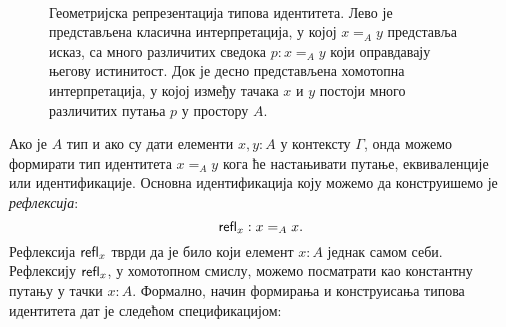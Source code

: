 \documentclass[12pt,oneside]{memoir}
\begin{document}
\begin{figure}[!ht]
    \centering\
    \label{fig:id_type}
    \caption{Геометријска репрезентација типова идентитета. Лево је представљена класична интерпретација, у којој $x =_A y$ представља исказ, са много различитих сведока $p : x =_A y$ који оправдавају његову истинитост. Док је десно представљена хомотопна интерпретација, у којој између тачака $x$ и $y$ постоји много различитих путања $p$ у простору $A$.}
\end{figure}

Ако је $A$ тип и ако су дати елементи $x, y : A$ у контексту $\Gamma$, онда можемо формирати тип идентитета $x =_A y$ кога ће настањивати путање, еквиваленције или идентификације. Основна идентификација коју можемо да конструишемо је \emph{рефлексија}:
\[ \mathsf{refl}_{x} : x =_A x. \]
Рефлексија $\mathsf{refl}_{x}$ тврди да је било који елемент $x : A$ једнак самом себи. Рефлексију $\mathsf{refl}_{x}$, у хомотопном смислу, можемо посматрати као константну путању у тачки $x : A$. Формално, начин формирања и конструисања типова идентитета дат је следећом спецификацијом:

\begin{samepage}
    \begin{center}
        \begin{minipage}{0.49\textwidth}
            \begin{prooftree}[$=$-form]
            \end{prooftree}
        \end{minipage}
        \begin{minipage}{0.39\textwidth}
            \begin{prooftree}[$=$-intro]
            \end{prooftree}
        \end{minipage}
    \end{center}
\end{samepage}
\end{document}
